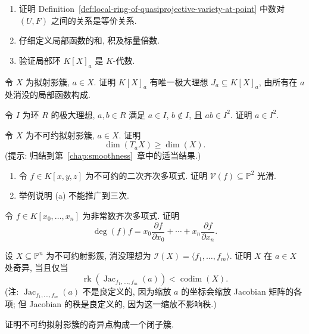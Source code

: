 \BookExerciseHeading
\begin{BookExercises}
  \item\label{ex:local-ring-equivalence-classes-and-algebra-operations}
  \begin{enumerate}
    \item 证明 Definition~\ref{def:local-ring-of-quasiprojective-variety-at-point} 中数对 $(U,F)$ 之间的关系是等价关系.
    \item 仔细定义局部函数的和, 积及标量倍数.
    \item 验证局部环 $K[X]_{a}$ 是 $K$-代数.
  \end{enumerate}
  \item\label{ex:unique-maximal-ideal-of-local-ring} 令 $X$ 为拟射影簇, $a\in X$. 证明 $K[X]_{a}$ 有唯一极大理想 $J_{a}\subseteq K[X]_{a}$, 由所有在 $a$ 处消没的局部函数构成.
  \item\label{ex:divide-out-factor-not-in-maximal-ideal-from-square} 令 $I$ 为环 $R$ 的极大理想, $a,b\in R$ 满足 $a\in I$, $b\notin I$, 且 $ab\in I^{2}$. 证明 $a\in I^{2}$.
  \item\label{ex:quasiprojective-tangent-dimension-at-least-variety-dimension} 令 $X$ 为不可约拟射影簇, $a\in X$. 证明
  \[
    \dim(T_{a}X)\ge\dim(X).
  \]
  (提示: 归结到第~\ref{chap:smoothness}~章中的适当结果.)
  \item\label{ex:smooth-projective-conics-and-singular-projective-cubics}
  \begin{enumerate}
    \item 令 $f\in K[x,y,z]$ 为不可约的二次齐次多项式. 证明 $\mathcal{V}(f)\subseteq\mathbb{P}^{2}$ 光滑.
    \item 举例说明 (a) 不能推广到三次.
  \end{enumerate}
  \item\label{ex:euler-identity-for-homogeneous-polynomials} 令 $f\in K[x_{0},\ldots,x_{n}]$ 为非常数齐次多项式. 证明
  \[
    \deg(f)f=x_{0}\frac{\partial f}{\partial x_{0}}+\cdots+x_{n}\frac{\partial f}{\partial x_{n}}.
  \]
  \item\label{ex:projective-jacobian-criterion} 设 $X\subseteq\mathbb{P}^{n}$ 为不可约射影簇, 消没理想为 $\mathcal{I}(X)=\langle f_{1},\ldots,f_{m}\rangle$. 证明 $X$ 在 $a\in X$ 处奇异, 当且仅当
  \[
    \operatorname{rk}(\operatorname{Jac}_{f_{1},\ldots,f_{m}}(a))<\operatorname{codim}(X).
  \]
  (注: $\operatorname{Jac}_{f_{1},\ldots,f_{m}}(a)$ 不是良定义的, 因为缩放 $a$ 的坐标会缩放 Jacobian 矩阵的各项; 但 Jacobian 的秩是良定义的, 因为这一缩放不影响秩.)
  \item\label{ex:singular-locus-of-irreducible-quasiprojective-variety-is-closed} 证明不可约拟射影簇的奇异点构成一个闭子簇.

\end{BookExercises}
